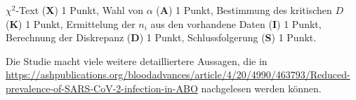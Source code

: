 \begin{bewertung}
$\chi^2$-Text ({\bf X}) 1 Punkt,
Wahl von $\alpha$ ({\bf A}) 1 Punkt,
Bestimmung des kritischen $D$ ({\bf K}) 1 Punkt,
Ermittelung der $n_i$ aus den vorhandene Daten ({\bf I}) 1 Punkt,
Berechnung der Diskrepanz ({\bf D}) 1 Punkt,
Schlussfolgerung ({\bf S}) 1 Punkt.
\end{bewertung}

\begin{diskussion}
Die Studie macht viele weitere detailliertere Aussagen, die in
\url{https://ashpublications.org/bloodadvances/article/4/20/4990/463793/Reduced-prevalence-of-SARS-CoV-2-infection-in-ABO}
nachgelesen werden können.
\end{diskussion}

